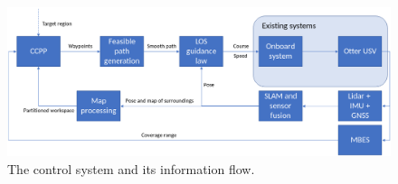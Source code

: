 \begin{figure}[h!]
	\centering
	\includegraphics[width=1.0\linewidth]{fig/topology}
	\caption{The control system and its information flow.}
	\label{fig:topology}
\end{figure}
